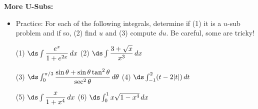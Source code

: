 \documentclass[12pt,letterpaper]{article}
\begin{document}
\pagestyle{fancy}
%


\begin{comment}
\begin{center}
\begin{tabular}{|rl|}
\hline
\multicolumn{2}{|c|}{Contact Information} \\
\hline
\bf{TA's name:} & Trevor Klar \\
\bf{Email:} & trevorklar@math.ucsb.edu \\
\bf{Office hours:} & Mondays 2:00-3:00 \\
\bf{Math Lab hours:} & Wednesdays 12:00-2:00 \\
\bf{Office:} & South Hall 6431x \\
\hline
\end{tabular}
\end{center}
\end{comment}


\noindent\textbf{More U-Subs:}

\begin{itemize}

\item Practice: For each of the following integrals, determine if (1) it is a $u$-sub problem and if so, (2) find $u$ and (3) compute $du$. Be careful, some are tricky!


(1) $\ds \int \dfrac{e^x}{1+e^{2x}} \, dx$ \hspace{1.75in} (2) $\ds \int \dfrac{3 + \sqrt{x}}{x^3} \, dx$

\vspace{1in}

(3) $\ds \int_0^{\pi/3} \dfrac{\sin\theta + \sin\theta\tan^2\theta}{\sec^2\theta} \, d\theta$ \hspace{0.82in} (4) $\ds \int_{-1}^2 (t-2|t|) \, dt$

\vspace{1in}

(5) $\ds \int \dfrac{x}{1+x^4} \, dx$ \hspace{1.8in} (6) $\ds \int_0^1 x \sqrt{1-x^4} \, dx$

\vspace{0.75in}


\end{itemize}
\end{document}
